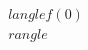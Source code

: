 \documentclass[preview]{standalone}
\begin{document}
\begin{align*}
\quad\\langle f(0) \quad\\rangle
\end{align*}
\end{document}
